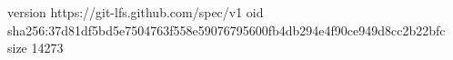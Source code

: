 version https://git-lfs.github.com/spec/v1
oid sha256:37d81df5bd5e7504763f558e59076795600fb4db294e4f90ce949d8cc2b22bfc
size 14273

